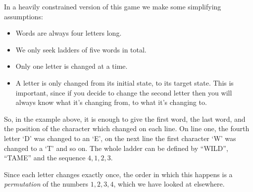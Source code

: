 

In a heavily constrained version of this game we make some simplifying assumptions:
\begin{itemize}
\item Words are always four letters long.
\item We only seek ladders of five words in total. 
\item Only one letter is changed at a time.
\item A letter is only changed from its initial state, to its target state. This is important, since if you decide to change the second letter then you will always know what it's changing from, to what it's changing to.
\end{itemize}

So, in the example above, it is enough to give the first word, the last word, and the position of the character which changed on each line. On line one, the fourth letter `D' was changed to an `E', on the next line the first character `W' was changed to a `T' and so on. The whole ladder can be defined by ``WILD'', ``TAME'' and the sequence $4,1,2,3$. 

\begin{center}
\end{center}

Since each letter changes exactly once, the order in which this happens is a {\em permutation} of the numbers $1,2,3,4$, which we have looked at elsewhere.
 
